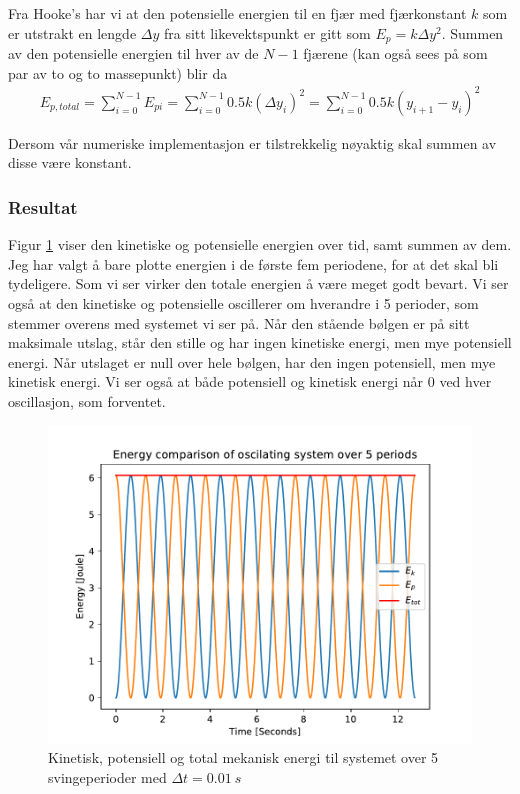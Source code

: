 \documentclass[12p,a4paper]{report}
\begin{document}
Fra Hooke's har vi at den potensielle energien til en fjær med fjærkonstant $k$ som er utstrakt en lengde $\Delta y$ fra sitt likevektspunkt er gitt som $E_p = k\Delta y^2$. Summen av den potensielle energien til hver av de $N-1$ fjærene (kan også sees på som par av to og to massepunkt) blir da
\begin{align*}
E_{p,total} = \sum\limits_{i=0}^{N-1} E_{pi} = \sum\limits_{i=0}^{N-1} 0.5k(\Delta y_i)^2 = \sum\limits_{i=0}^{N-1} 0.5k(y_{i+1} - y_i)^2
\end{align*}

Dersom vår numeriske implementasjon er tilstrekkelig nøyaktig skal summen av disse være konstant.

\subsubsection*{Resultat}
Figur \ref{fig:energy_cons} viser den kinetiske og potensielle energien over tid, samt summen av dem. Jeg har valgt å bare plotte energien i de første fem periodene, for at det skal bli tydeligere. Som vi ser virker den totale energien å være meget godt bevart. Vi ser også at den kinetiske og potensielle oscillerer om hverandre i 5 perioder, som stemmer overens med systemet vi ser på. Når den stående bølgen er på sitt maksimale utslag, står den stille og har ingen kinetiske energi, men mye potensiell energi. Når utslaget er null over hele bølgen, har den ingen potensiell, men mye kinetisk energi. Vi ser også at både potensiell og kinetisk energi når 0 ved hver oscillasjon, som forventet. 
\begin{figure}[H]
\centering
\includegraphics[width=\textwidth]{../fig/energy_cons.pdf}
\caption{Kinetisk, potensiell og total mekanisk energi til systemet over 5 svingeperioder med $\Delta t = \SI{0.01}{s}$}
\label{fig:energy_cons}
\end{figure}
\end{document}
